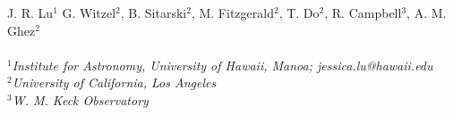 J. R. Lu${}^1$
G. Witzel${}^2$,
B. Sitarski${}^2$,
M. Fitzgerald${}^2$,
T. Do${}^2$,
R. Campbell${}^3$,
A. M. Ghez${}^2$
\\
\\
${}^1${\em Institute for Astronomy, University of Hawaii, Manoa; jessica.lu@hawaii.edu}
\\
${}^2${\em University of California, Los Angeles}
\\
${}^3${\em W. M. Keck Observatory}
